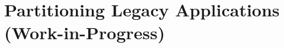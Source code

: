 \declarecommand{\sysname}{\civet{}}

\chapter{Partitioning Legacy \java{} Applications\\ (Work-in-Progress)}
\label{chap:civet}






%

